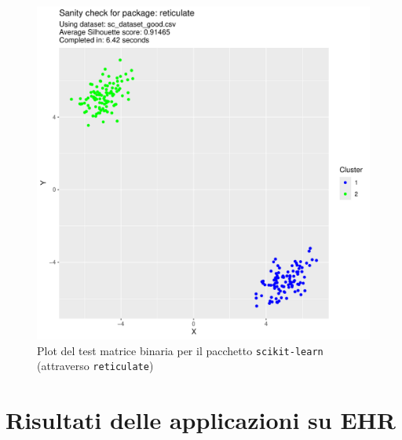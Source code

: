 \documentclass[12pt]{report}
\begin{document}
			\begin{figure}[h]
				\includegraphics[width = \textwidth, page = 3]{results/results_RETICULATE.pdf}
				\caption{Plot del test matrice binaria per il pacchetto
				\texttt{scikit-learn} (attraverso \texttt{reticulate})}
				\label{fig:reticulatebm}
			\end{figure}

		\section{Risultati delle applicazioni su EHR}
\end{document}
